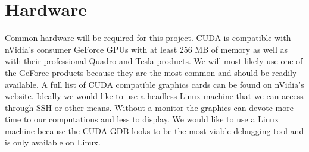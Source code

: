 \section*{Hardware}
Common hardware will be required for this project.  CUDA is compatible with
nVidia's consumer GeForce GPUs with at least 256 MB of memory as well as with
their professional Quadro and
Tesla products.  We will most likely use one of the GeForce products because
they are the most common and should be readily available. A full list of CUDA
compatible graphics cards can be found on nVidia's website. Ideally we would like
to use a headless Linux machine that we can access through SSH or other means.
Without a monitor the graphics can devote more time to our computations and less
to display.  We would like to use a Linux machine because the CUDA-GDB looks to be
the most viable debugging tool and is only available on Linux.


